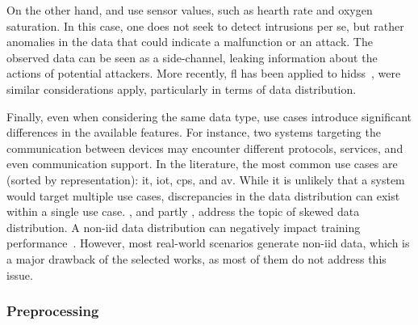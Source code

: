 On the other hand, \textcite{zhang_BlockchainbasedFederatedLearning_2020} and \textcite{schneble_Attackdetectionusing_2019} use sensor values, such as hearth rate and oxygen saturation.
In this case, one does not seek to detect intrusions per se, but rather anomalies in the data that could indicate a malfunction or an attack.
The observed data can be seen as a side-channel, leaking information about the actions of potential attackers.
More recently, \gls{fl} has been applied to \glspl{hids}~\cite{guo_NewFederatedLearning_2023}, were similar considerations apply, particularly in terms of data distribution.

Finally, even when considering the same data type, use cases introduce significant differences in the available features.
For instance, two systems targeting the communication between devices may encounter different protocols, services, and even communication support.
In the literature, the most common use cases are (sorted by representation): \acrfull{it}, \acrfull{iot}, \acrfull{cps}, and \acrfull{av}.
While it is unlikely that a system would target multiple use cases, discrepancies in the data distribution can exist within a single use case.
\textcite{chen_Networkanomalydetection_2020}, and partly \textcite{hei_trustedfeatureaggregator_2020}, address the topic of skewed data distribution.
A non-\gls{iid} data distribution can negatively impact training performance~\cite{yang_FederatedMachineLearning_2019}.
However, most real-world scenarios generate non-\gls{iid} data, which is a major drawback of the selected works, as most of them do not address this issue.


\subsubsection{Preprocessing\label{sec:sota.quali.preprocess}}




